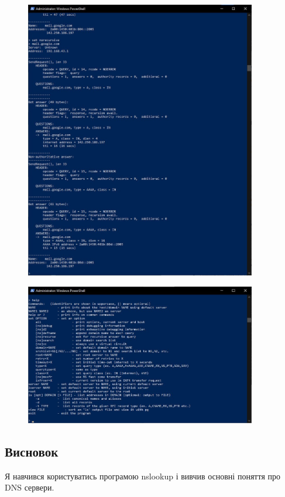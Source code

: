 \documentclass[12pt]{extarticle}
\begin{document}
\begin{figure}[H]
    \centering
    \includegraphics[width=0.90\textwidth]{no_recursion}
    \caption{}
\end{figure}


\begin{figure}[H]
    \centering
    \includegraphics[width=0.90\textwidth]{help}
    \caption{}
\end{figure}

\subsection*{Висновок} 
Я навчився користуватись програмою nslookup і вивчив основні поняття
про DNS сервери.
\end{document}
